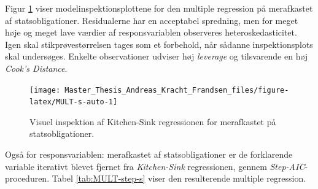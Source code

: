 \documentclass[
  a4paper,
  oneside]{memoir}
\begin{document}
Figur \ref{fig:MULT-s-auto} viser modelinspektionsplottene for den multiple regression på merafkastet af statsobligationer. Residualerne har en acceptabel spredning, men for meget høje og meget lave værdier af responsvariablen observeres heteroskedasticitet. Igen skal stikprøvestørrelsen tages som et forbehold, når sådanne inspektionsplots skal undersøges. Enkelte observationer udviser høj \emph{leverage} og tilsvarende en høj \emph{Cook's Distance}.

\begin{figure}[H]

{\centering \texttt{[image: Master\_Thesis\_Andreas\_Kracht\_Frandsen\_files/figure-latex/MULT-s-auto-1]} 

}

\caption{Visuel inspektion af Kitchen-Sink regressionen for merafkastet på statsobligationer.}\label{fig:MULT-s-auto}
\end{figure}

Også for responsvariablen: merafkastet af statsobligationer er de forklarende variable iterativt blevet fjernet fra \emph{Kitchen-Sink} regressionen, gennem \emph{Step-AIC}-proceduren. Tabel \ref{tab:MULT-step-s} viser den resulterende multiple regression.
\end{document}
